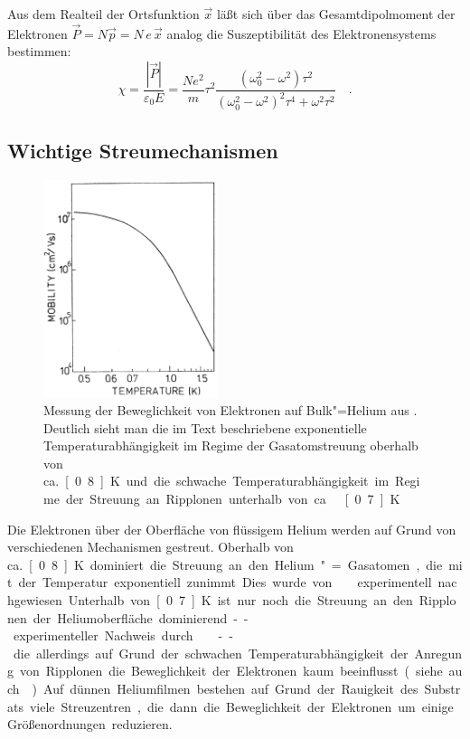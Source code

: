 Aus dem Realteil der Ortsfunktion $\vec x$ läßt sich über das Gesamtdipolmoment der Elektronen $\vec P=N\vec p=N\,e\,\vec x$ analog die Suszeptibilität des Elektronensystems bestimmen:
\begin{equation}
\chi=\frac{\left|\vec P\right|}{\varepsilon_0E}=\frac{Ne^2}{m}\tau^2\frac{(\omega_0^2-\omega^2)\tau^2}{\left(\omega_0^2-\omega^2\right)^2\tau^4+\omega^2\tau^2}\quad.
\end{equation}

\subsection{Wichtige Streumechanismen}
\label{ssec:scattering}

\begin{figure}[h!tp]
	\hfill\includegraphics[width=2in]{theo_electrons_on_helium/mobility}\hfill
	\begin{minipage}[b]{\textwidth-\smallwidth-2\tabcolsep}
		\caption[Temperaturabhängigkeit der Beweglichkeit von Elektronen auf Bulk"=Helium]{Messung der Beweglichkeit von Elektronen auf Bulk"=Helium aus \cite{Lei92}. Deutlich sieht man die im Text beschriebene exponentielle Temperaturabhängigkeit im Regime der Gasatomstreuung oberhalb von ca.\ \unit[0.8]{K} und die schwache Temperaturabhängigkeit im Regime der Streuung an Ripplonen unterhalb von ca.\ \unit[0.7]{K}.\label{fig:mobility}}
	\end{minipage}
\end{figure}

Die Elektronen über der Oberfläche von flüssigem Helium werden auf Grund von verschiedenen Mechanismen gestreut. Oberhalb von ca.\ \unit[0.8]{K} dominiert die Streuung an den Helium"=Gasatomen, die mit der Temperatur exponentiell zunimmt. Dies wurde von  \ea \cite{Som71} experimentell nachgewiesen. Unterhalb von \unit[0.7]{K} ist nur noch die Streuung an den Ripplonen der Heliumoberfläche dominierend -- experimenteller Nachweis durch  \ea \cite{Gri76} -- die allerdings auf Grund der schwachen Temperaturabhängigkeit der Anregung von Ripplonen die Beweglichkeit der Elektronen kaum beeinflusst (siehe auch \cite{Bri77,Col74}). Auf dünnen Heliumfilmen bestehen auf Grund der Rauigkeit des Substrats viele Streuzentren, die dann die Beweglichkeit der Elektronen um einige Größenordnungen reduzieren. 
